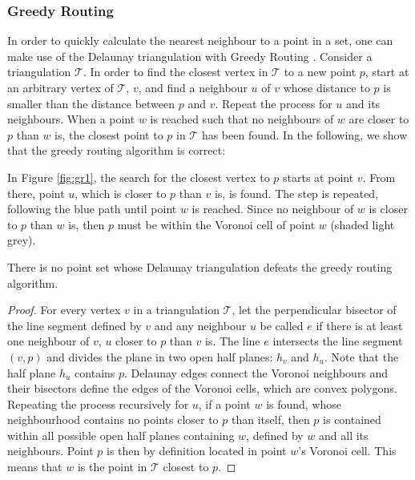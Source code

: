 \subsubsection*{Greedy Routing}
\label{r:gr}
In order to quickly calculate the nearest neighbour to a point in a set, one can make use of the Delaunay triangulation with Greedy Routing \cite{greedyroute}.
Consider a triangulation $\mathcal{T}$. In order to find the closest vertex in $\mathcal{T}$ to a new point $p$, start at an arbitrary vertex of $\mathcal{T}$, $v$, and find a neighbour $u$ of $v$ whose distance to $p$ is smaller than the distance between $p$ and $v$. Repeat the process for $u$ and its neighbours. When a point $w$ is reached such that no neighbours of $w$ are closer to $p$ than $w$ is, the closest point to $p$ in $\mathcal{T}$ has been found. In the following, we show that the greedy routing algorithm is correct:

\noindent
In Figure \ref{fig:gr1}, the search for the closest vertex to $p$ starts at point $v$. From there, point $u$, which is closer to $p$ than $v$ is, is found. The step is repeated, following the blue path until point $w$ is reached. Since no neighbour of $w$ is closer to $p$ than $w$ is, then $p$ must be within the Voronoi cell of point $w$ (shaded light grey).
\begin{theorem}
\cite{greedyroute}
There is no point set whose Delaunay triangulation defeats the greedy routing algorithm.
\begin{proof}
For every vertex $v$ in a triangulation $\mathcal{T}$, let the perpendicular bisector of the line segment defined by $v$ and any neighbour $u$ be called $e$ if there is at least one neighbour of $v$, $u$ closer to $p$ than $v$ is. The line $e$ intersects the line segment $(v,p)$ and divides the plane in two open half planes: $h_v$ and $h_u$. Note that the half plane $h_u$ contains $p$. Delaunay edges connect the Voronoi neighbours and their bisectors define the edges of the Voronoi cells, which are convex polygons. Repeating the process recursively for $u$, if a point $w$ is found, whose neighbourhood contains no points closer to $p$ than itself, then $p$ is contained within all possible open half planes containing $w$, defined by $w$ and all its neighbours. Point $p$ is then by definition located in point $w$'s Voronoi cell. This means that $w$ is the point in $\mathcal{T}$ closest to $p$.
\end{proof}
\end{theorem}
